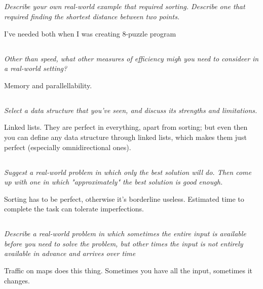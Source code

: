 \documentclass[11pt,oneside,titlepage]{book}
\begin{document}
\subsection{}

\textit{Describe your own real-world example that required sorting. Describe one
  that required finding the shortest distance between two points.}

I've needed both when I was creating 8-puzzle program

\subsection{}

\textit{Other than speed, what other measures of efficiency migh you need to consideer
  in a real-world setting?}

Memory and parallellability.

\subsection{}

\textit{Select a data structure that you've seen, and discuss its strengths and limitations.}

Linked lists. They are perfect in everything, apart from sorting; but even then you can define
any data structure through linked lists, which makes them just perfect (especially
omnidirectional ones).

\subsection{}

\textit{Suggest a real-world problem in which only the best solution will do. Then come up
  with one in which "approximately" the best solution is good enough.}

Sorting has to be perfect, otherwise it's borderline useless. Estimated time to
complete the task can tolerate imperfections.

\subsection{}

\textit{Describe a real-world problem in which sometimes the entire input is available
  before you need to solve the problem, but other times the input is not
  entirely available in advance and arrives over time}

Traffic on maps does this thing. Sometimes you have all the input, sometimes it changes.
\end{document}
